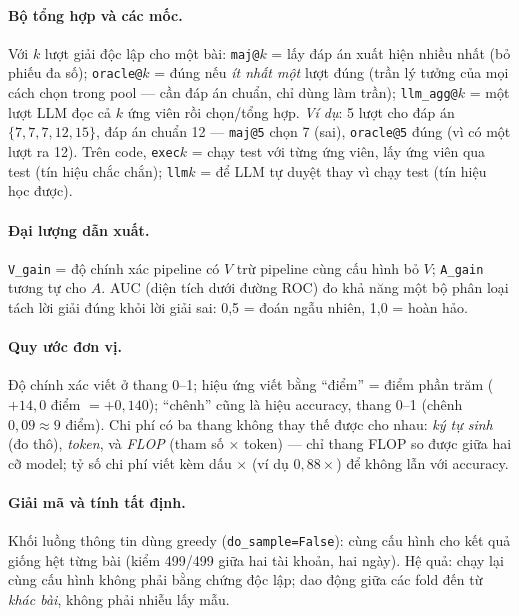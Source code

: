 \documentclass[11pt,a4paper]{article}
\begin{document}
\paragraph{Bộ tổng hợp và các mốc.} Với $k$ lượt giải độc lập cho một bài:
\texttt{maj@}$k$ = lấy đáp án xuất hiện nhiều nhất (bỏ phiếu đa số);
\texttt{oracle@}$k$ = đúng nếu \emph{ít nhất một} lượt đúng (trần lý tưởng của mọi cách chọn
trong pool --- cần đáp án chuẩn, chỉ dùng làm trần);
\texttt{llm\_agg@}$k$ = một lượt LLM đọc cả $k$ ứng viên rồi chọn/tổng hợp.
\emph{Ví dụ}: 5 lượt cho đáp án $\{7, 7, 7, 12, 15\}$, đáp án chuẩn 12 --- \texttt{maj@5} chọn
7 (sai), \texttt{oracle@5} đúng (vì có một lượt ra 12). Trên code, \texttt{exec}$k$ = chạy test
với từng ứng viên, lấy ứng viên qua test (tín hiệu chắc chắn); \texttt{llm}$k$ = để LLM tự
duyệt thay vì chạy test (tín hiệu học được).

\paragraph{Đại lượng dẫn xuất.} \texttt{V\_gain} = độ chính xác pipeline có $V$ trừ pipeline
cùng cấu hình bỏ $V$; \texttt{A\_gain} tương tự cho $A$. AUC (diện tích dưới đường ROC) đo khả
năng một bộ phân loại tách lời giải đúng khỏi lời giải sai: 0,5 = đoán ngẫu nhiên, 1,0 = hoàn
hảo.

\paragraph{Quy ước đơn vị.} Độ chính xác viết ở thang 0--1; hiệu ứng viết bằng ``điểm'' = điểm
phần trăm ($+14{,}0$ điểm $= +0{,}140$); ``chênh'' cũng là hiệu accuracy, thang 0--1 (chênh
$0{,}09 \approx 9$ điểm). Chi phí có ba thang không thay thế được cho nhau: \emph{ký tự sinh}
(đo thô), \emph{token}, và \emph{FLOP} (tham số $\times$ token) --- chỉ thang FLOP so được giữa
hai cỡ model; tỷ số chi phí viết kèm dấu $\times$ (ví dụ $0{,}88\times$) để không lẫn với
accuracy.

\paragraph{Giải mã và tính tất định.} Khối luồng thông tin dùng greedy
(\texttt{do\_sample=False}): cùng cấu hình cho kết quả giống hệt từng bài (kiểm 499/499 giữa
hai tài khoản, hai ngày). Hệ quả: chạy lại cùng cấu hình không phải bằng chứng độc lập; dao
động giữa các fold đến từ \emph{khác bài}, không phải nhiễu lấy mẫu.
\end{document}
